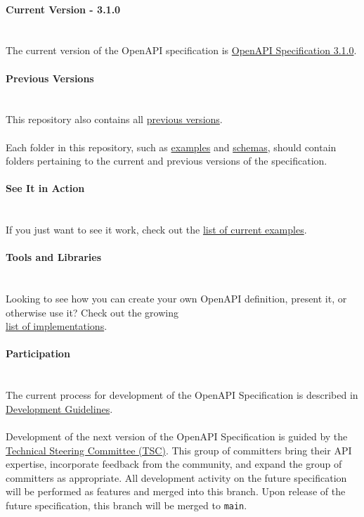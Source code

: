 \documentclass{article}
\begin{document}
\\
{\noindent \LARGE \textbf{Current Version - 3.1.0}}\\\\
\\
The current version of the OpenAPI specification is \href{versions/3.1.0.md}{OpenAPI Specification 3.1.0}.\\
\\
{\noindent \Large \textbf{Previous Versions}}\\\\
\\
This repository also contains all \href{versions}{previous versions}.\\
\\
Each folder in this repository, such as \href{examples}{examples} and \href{schemas}{schemas}, should contain folders pertaining to the current and previous versions of the specification.\\
\\
{\noindent \LARGE \textbf{See It in Action}}\\\\
\\
If you just want to see it work, check out the \href{examples}{list of current examples}.\\
\\
{\noindent \LARGE \textbf{Tools and Libraries}}\\\\
\\
Looking to see how you can create your own OpenAPI definition, present it, or otherwise use it? Check out the growing\\
\href{IMPLEMENTATIONS.md}{list of implementations}.\\
\\
{\noindent \LARGE \textbf{Participation}}\\\\
\\
The current process for development of the OpenAPI Specification is described in \href{DEVELOPMENT.md}{Development Guidelines}.\\
\\
Development of the next version of the OpenAPI Specification is guided by the \href{https://www.openapis.org/participate/how-to-contribute/governance#TDC}{Technical Steering Committee (TSC)}. This group of committers bring their API expertise, incorporate feedback from the community, and expand the group of committers as appropriate. All development activity on the future specification will be performed as features and merged into this branch. Upon release of the future specification, this branch will be merged to \verb|main|.\\
\end{document}
